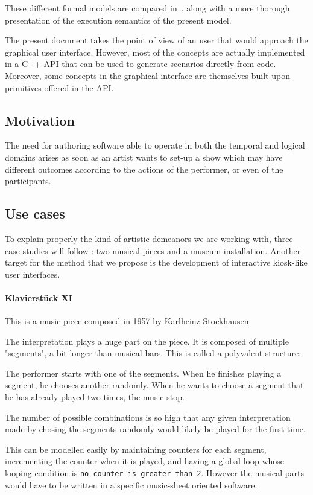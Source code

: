 \documentclass{sigchi}
\begin{document}
These different formal models are compared in~\cite{celerier2015ossia}, along with a more thorough presentation of the execution semantics of the present model.

The present document takes the point of view of an user that would approach the graphical user interface. However, most of the concepts are actually implemented in a C++ API\cite{hogue2014ossia} that can be used to generate scenarios directly from code. Moreover, some concepts in the graphical interface are themselves built upon primitives offered in the API.

\subsection{Motivation}
The need for authoring software able to operate in both the temporal and logical domains arises as soon as an artist wants to set-up a show which may have different outcomes according to the actions of the performer, or even of the participants.

\subsection{Use cases}
To explain properly the kind of artistic demeanors we are working with, three case studies will follow : two musical pieces and a museum installation. Another target for the method that we propose is the development of interactive kiosk-like user interfaces.

\paragraph{Klavierstück XI}
This is a music piece composed in 1957 by Karlheinz Stockhausen.

The interpretation plays a huge part on the piece. It is composed of multiple "segments", a bit longer than musical bars. This is called a polyvalent structure.

The performer starts with one of the segments. When he finishes playing a segment, he chooses another randomly. When he wants to choose a segment that he has already played two times, the music stop.

The number of possible combinations is so high that any given interpretation made by chosing the segments randomly would likely be played for the first time.

This can be modelled easily by maintaining counters for each segment, incrementing the counter when it is played, and having a global loop whose looping condition is \texttt{no counter is greater than 2}. However the musical parts would have to be written in a specific music-sheet oriented software.
\end{document}
